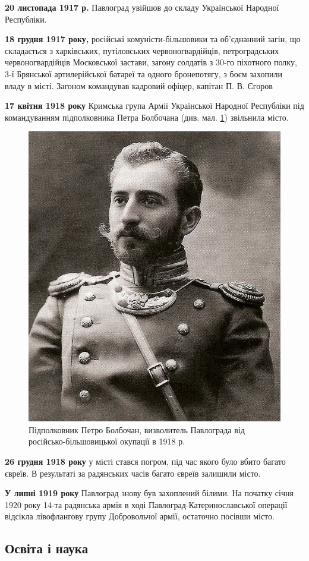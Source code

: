 \begin{itemize}
	\textbf{20 листопада 1917 р.} Павлоград увійшов до складу Української Народної Республіки.
	
	\textbf{18 грудня 1917 року,} російські комуністи-більшовики та об'єднанний загін, що складається з харківських, путіловських червоногвардійців, петроградських червоногвардійців Московської застави, загону солдатів з 30-го піхотного полку, 3-ї Брянської артилерійської батареї та одного бронепотягу, з боєм захопили владу в місті. Загоном командував кадровий офіцер, капітан П. В. Єгоров
	
	\textbf{17 квітня 1918 року} Кримська група Армії Української Народної Республіки під командуванням підполковника Петра Болбочана (див. мал. \ref{fig:Petro_Bolbochan}) звільнила місто.
	
\begin{figure}[h]
	\centering
	\includegraphics[width=0.6\linewidth]{./images-mylyar/Petro_Bolbochan.jpg}
	\caption{
		\centering
		Підполковник Петро Болбочан, визволитель Павлограда від російсько-більшовицької окупації в 1918 р.}
	\label{fig:Petro_Bolbochan}
\end{figure}

	\textbf{26 грудня 1918 року} у місті стався погром, під час якого було вбито багато євреїв. В результаті за радянських часів багато євреїв залишили місто.
	
	\textbf{У липні 1919 року} Павлоград знову був захоплений білими. На початку січня 1920 року 14-та радянська армія в ході Павлоград-Катеринославської операції відсікла лівофлангову групу Добровольчої армії, остаточно посівши місто.
\end{itemize}
\subsection{Освіта і наука}

